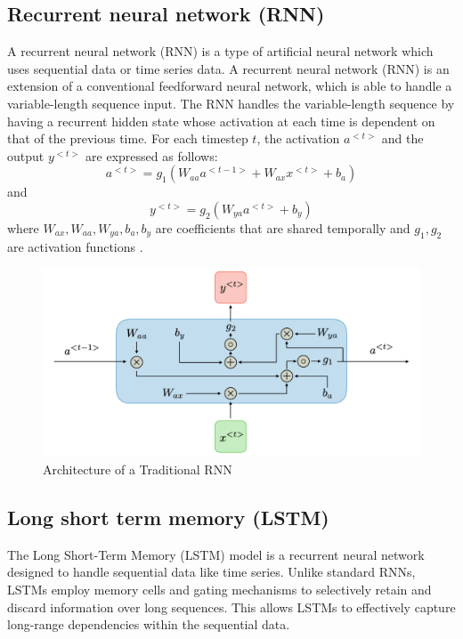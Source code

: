 \documentclass{ieeeojies}
\begin{document}
\subsection{Recurrent neural network (RNN)}
A recurrent neural network (RNN) is a type of artificial neural network which uses sequential data or time series data\cite{IBM}.  A recurrent neural network (RNN) is an extension of a conventional feedforward neural network, which is able to handle a variable-length sequence input. The RNN handles the variable-length sequence by having a recurrent hidden state whose activation at each time is dependent on that of the previous time\cite{Chung}.
For each timestep \( t \), the activation \( a^{<t>} \) and the output \( y^{<t>} \) are expressed as follows:
\[
a^{<t>} = g_1\left( W_{aa} a^{<t-1>} + W_{ax} x^{<t>} + b_a \right)
\]
and
\[
y^{<t>} = g_2\left( W_{ya} a^{<t>} + b_y \right)
\]
where \( W_{ax}, W_{aa}, W_{ya}, b_a, b_y \) are coefficients that are shared temporally and \( g_1, g_2 \) are activation functions \cite{standford}.

\begin{figure}[H]
    \centering
\begin{minipage}{0.5\textwidth}
        \centering
        \includegraphics[width=\textwidth]{bibliography/Figure/RNNmodel.png}
        \caption{Architecture of a Traditional RNN}
        \label{fig:3}
\end{minipage}
\end{figure}

\subsection{Long short term memory (LSTM)}
The Long Short-Term Memory (LSTM) model is a recurrent neural network designed to handle sequential data like time series. Unlike standard RNNs, LSTMs employ memory cells and gating mechanisms to selectively retain and discard information over long sequences. This allows LSTMs to effectively capture long-range dependencies within the sequential data\cite{LSTM1}.
\end{document}
